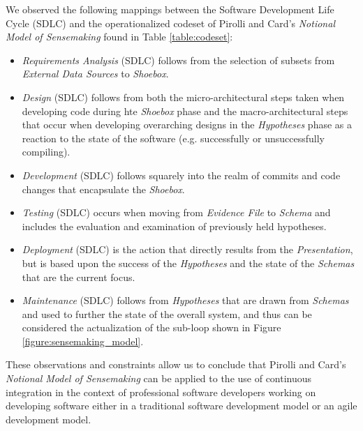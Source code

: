 \documentclass{sig-alternate}
\begin{document}
We observed the following mappings between the Software Development Life Cycle (SDLC)\cite{singh:lifecycle} and the operationalized codeset of Pirolli and Card's \textit{Notional Model of Sensemaking}\cite{pirolli:sensemaking} found in Table \ref{table:codeset}:

\begin{itemize}  
	\item \textit{Requirements Analysis} (SDLC) follows from the selection of subsets from \textit{External Data Sources} to \textit{Shoebox}.
	\item \textit{Design} (SDLC) follows from both the micro-architectural steps taken when developing code during hte \textit{Shoebox} phase and the macro-architectural steps that occur when developing overarching designs in the \textit{Hypotheses} phase as a reaction to the state of the software (e.g. successfully or unsuccessfully compiling).
	\item \textit{Development} (SDLC) follows squarely into the realm of commits and code changes that encapsulate the \textit{Shoebox}.
	\item \textit{Testing} (SDLC) occurs when moving from \textit{Evidence File} to \textit{Schema} and includes the evaluation and examination of previously held hypotheses.
	\item \textit{Deployment} (SDLC) is the action that directly results from the \textit{Presentation}, but is based upon the success of the \textit{Hypotheses} and the state of the \textit{Schemas} that are the current focus.
	\item \textit{Maintenance} (SDLC) follows from \textit{Hypotheses} that are drawn from \textit{Schemas} and used to further the state of the overall system, and thus can be considered the actualization of the sub-loop shown in Figure \ref{figure:sensemaking_model}.
\end{itemize}

These observations and constraints allow us to conclude that Pirolli and Card's \textit{Notional Model of Sensemaking}\cite{pirolli:sensemaking} can be applied to the use of continuous integration in the context of professional software developers working on developing software either in a traditional software development model or an agile development model.
\end{document}
